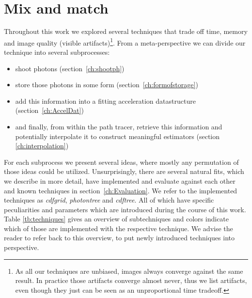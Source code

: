 \section{Mix and match}

Throughout this work we explored several techniques that trade off time, memory and image quality (visible artifacts)\footnote{As all our techniques are unbiased, images always converge against the same result. In practice those artifacts converge almost never, thus we list artifacts, even though they just can be seen as an unproportional time tradeoff.}. From a meta-perspective we can divide our technique into several subprocesses:

\begin{itemize}
    \item shoot photons (section~\ref{ch:shootph})
    \item store those photons in some form (section~\ref{ch:formofstorage})
    \item add this information into a fitting acceleration datastructure (section~\ref{ch:AccelDat})
    \item and finally, from within the path tracer, retrieve this information and potentially interpolate it to construct meaningful estimators (section \ref{ch:interpolation})
\end{itemize}

For each subprocess we present several ideas, where mostly any permutation of those ideas could be utilized. Unsurprisingly, there are several natural fits, which we describe in more detail, have implemented and evaluate against each other and known techniques in section~\ref{ch:Evaluation}. We refer to the implemented techniques as \textit{cdfgrid}, \textit{photontree} and \textit{cdftree}. All of which have specific peculiarities and parameters which are introduced during the course of this work. Table \ref{tb:techniques} gives an overview of subtechniques and colors indicate which of those are implemented with the respective technique. We advise the reader to refer back to this overview, to put newly introduced techniques into perspective.

